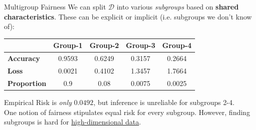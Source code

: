 \documentclass{beamer}
\begin{document}
\begin{frame}{Multigroup Fairness}
	We can split $\mathcal{D}$ into various \textit{subgroups} based on \textbf{shared characteristics}. These can be explicit or implicit (i.e. subgroups we don't know of):
	\begin{table}[t]
		\begin{center}
			\begin{tabular}{lcccc}
				\toprule
				& \bf Group-1 & \bf Group-2 & \bf Group-3 & \bf Group-4 \\
				\midrule
				\bf Accuracy & 0.9593 & 0.6249 & 0.3157 & 0.2664 \\
				\bf Loss & 0.0021 & 0.4102 & 1.3457 & 1.7664 \\
				\bf Proportion & 0.9 & 0.08 & 0.0075 & 0.0025 \\
				\bottomrule
			\end{tabular}
		\end{center}
	\end{table} \pause
	Empirical Risk is \textit{only} $0.0492$, but inference is unreliable for subgroups 2-4. \pause \newline \\

	One notion of fairness stipulates equal risk for every subgroup. However, finding subgroups is hard for \underline{high-dimensional data}.
\end{frame}
\end{document}
